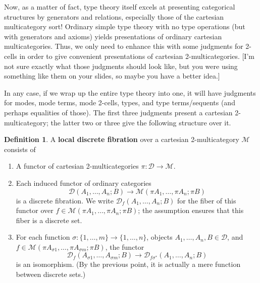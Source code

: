 \documentclass{amsart}
\theoremstyle{definition}
\newtheorem{defn}[thm]{Definition}
\def\M{\mathcal{M}}
\def\D{\mathcal{D}}
\begin{document}
Now, as a matter of fact, type theory itself excels at presenting categorical structures by generators and relations, especially those of the cartesian multicategory sort!
Ordinary simple type theory with no type operations (but with generators and axioms) yields presentations of ordinary cartesian multicategories.
Thus, we only need to enhance this with some judgments for 2-cells in order to give convenient presentations of cartesian 2-multicategories.
[I'm not sure exactly what those judgments should look like, but you were using something like them on your slides, so maybe you have a better idea.]

In any case, if we wrap up the entire type theory into one, it will have judgments for modes, mode terms, mode 2-cells, types, and type terms/sequents (and perhaps equalities of those).
The first three judgments present a cartesian 2-multicategory; the latter two or three give the following structure over it.

\begin{defn}
  A \textbf{local discrete fibration} over a cartesian 2-multicategory $\M$ consists of
  \begin{enumerate}
  \item A functor of cartesian 2-multicategories $\pi:\D\to\M$.
  \item Each induced functor of ordinary categories
    \[\D(A_1,\dots,A_n;B)\to\M(\pi A_1,\dots,\pi A_n;\pi B)\]
    is a discrete fibration.
    We write $\D_f(A_1,\dots,A_n;B)$ for the fiber of this functor over $f\in \M(\pi A_1,\dots,\pi A_n;\pi B)$; the assumption ensures that this fiber is a discrete set.
  \item For each function $\sigma : \{1,\dots,m\} \to \{1,\dots,n\}$, objects $A_1,\dots,A_n,B \in \D$, and $f\in\M(\pi A_{\sigma 1},\dots,\pi A_{\sigma m}; \pi B)$, the functor
    \[\D_f(A_{\sigma 1},\dots,A_{\sigma m}; B) \to \D_{f\sigma^*}(A_1,\dots,A_n;B)\]
    is an isomorphism.
    (By the previous point, it is actually a mere function between discrete sets.)
  \end{enumerate}
\end{defn}
\end{document}
